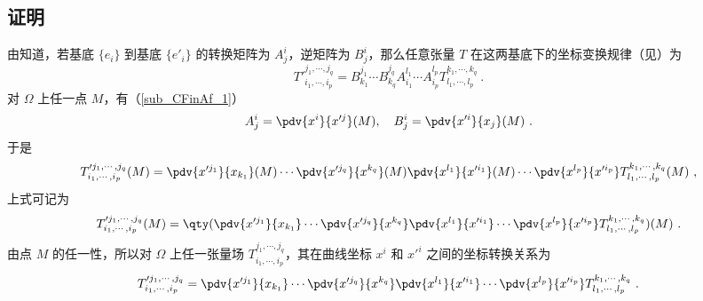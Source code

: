 \subsection{证明}
由知道，若基底 $\{e_i\}$ 到基底 $\{e'_i\}$ 的转换矩阵为 $A^i_j$，逆矩阵为 $B^i_j$，那么任意张量 $T$ 在这两基底下的坐标变换规律（见）为
\begin{equation}
T'^{j_1,\cdots,j_q}_{i_1,\cdots,i_p}=B^{j_1}_{k_1}\cdots B^{j_q}_{k_q}A^{l_1}_{i_1}\cdots A^{l_p}_{i_p}T^{k_1,\cdots,k_q}_{l_1,\cdots,l_p}~.
\end{equation}
对 $\Omega$ 上任一点 $M$，有（\autoref{sub_CFinAf_1}）
\begin{equation}
A^i_j=\pdv{x^i}{x'^j}(M),\quad B^i_j=\pdv{x'^i}{x_j}(M)~.
\end{equation}
于是
\begin{equation}
T'^{j_1,\cdots,j_q}_{i_1,\cdots,i_p}(M)=\pdv{x'^{j_1}}{x_{k_1}}(M)\cdots \pdv{x'^{j_q}}{x^{k_q}}(M)\pdv{x^{l_1}}{x'^{i_1}}(M)\cdots \pdv{x^{l_p}}{x'^{i_p}}T^{k_1,\cdots,k_q}_{l_1,\cdots,l_p}(M)~,
\end{equation}
上式可记为
\begin{equation}
T'^{j_1,\cdots,j_q}_{i_1,\cdots,i_p}(M)=\qty(\pdv{x'^{j_1}}{x_{k_1}}\cdots \pdv{x'^{j_q}}{x^{k_q}}\pdv{x^{l_1}}{x'^{i_1}}\cdots \pdv{x^{l_p}}{x'^{i_p}}T^{k_1,\cdots,k_q}_{l_1,\cdots,l_p})(M)~.
\end{equation}
由点 $M$ 的任一性，所以对 $\Omega$ 上任一张量场 $T^{j_1,\cdots,j_q}_{i_1,\cdots,i_p}$，其在曲线坐标 $x^i$ 和 $x'^i$ 之间的坐标转换关系为
\begin{equation}
T'^{j_1,\cdots,j_q}_{i_1,\cdots,i_p}=\pdv{x'^{j_1}}{x_{k_1}}\cdots \pdv{x'^{j_q}}{x^{k_q}}\pdv{x^{l_1}}{x'^{i_1}}\cdots \pdv{x^{l_p}}{x'^{i_p}}T^{k_1,\cdots,k_q}_{l_1,\cdots,l_p}~.
\end{equation}




